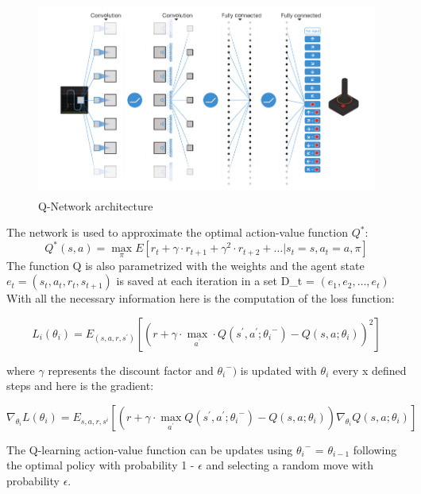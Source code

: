 \begin{figure}[h]
	\begin{center}
		\includegraphics[width=442px,height=242px]{src/img/state/schematic-ilustration}
		\caption{Q-Network architecture\cite{nature}} \label{fig:arch}
    \end{center}
\end{figure}

The network is used to approximate the optimal action-value function $Q^{*}$\cite{nature}:
\begin{equation}
	Q^{*}(s,a) = \max_\pi E[r_t + \gamma\cdot r_{t+1} + \gamma^2\cdot r_{t+2} + \dotsc | s_t = s, a_t = a, \pi]
\end{equation}
The function Q is also parametrized with the weights and the agent state $e_t = (s_t,a_t,r_t,s_{t+1})$ is saved at each iteration in a set D_t = ${(e_1, e_2, \dotsc, e_t)}$
With all the necessary information here is the computation of the loss function\cite{nature}:

\begin{equation}
	L_i(\theta_i)=E_{(s,a,r,s^{\prime})}[(r + \gamma\cdot\max_{a^{\prime}}\cdot Q(s^{\prime},a^{\prime};{\theta_i}^-) - Q(s,a;\theta_i))^2]
\end{equation}

where $\gamma$ represents the discount factor and ${\theta_i}^-)$ is updated with $\theta_i$ every x defined steps and here is the gradient\cite{nature}:

\begin{equation}
\nabla_{\theta_i}L(\theta_i) = E_{s,a,r,{s^i}}[(r + \gamma\cdot\max_{a^{\prime}}Q(s^\prime, a^\prime;{\theta_i}^-)-Q(s,a;\theta_i))\nabla_{\theta_i}Q(s,a;\theta_i)]
\end{equation}

The Q-learning action-value function can be updates using ${\theta_i}^-$ = $\theta_{i-1}$ following the optimal policy with probability 1 - $\epsilon$ and selecting a random move with probability $\epsilon$. 

